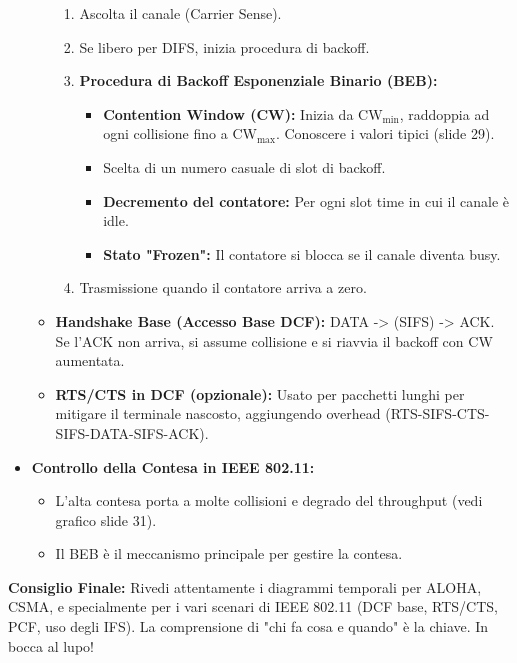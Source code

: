 \begin{itemize}
\begin{itemize}
        \begin{enumerate}
            \item Ascolta il canale (Carrier Sense).
            \item Se libero per DIFS, inizia procedura di backoff.
            \item \textbf{Procedura di Backoff Esponenziale Binario (BEB):}
            \begin{itemize}
                \item \textbf{Contention Window (CW):} Inizia da $\text{CW}_{\min}$, raddoppia ad ogni collisione fino a $\text{CW}_{\max}$. Conoscere i valori tipici (slide 29).
                \item Scelta di un numero casuale di slot di backoff.
                \item \textbf{Decremento del contatore:} Per ogni slot time in cui il canale è idle.
                \item \textbf{Stato "Frozen":} Il contatore si blocca se il canale diventa busy.
            \end{itemize}
            \item Trasmissione quando il contatore arriva a zero.
        \end{enumerate}
        \item \textbf{Handshake Base (Accesso Base DCF):} DATA -> (SIFS) -> ACK. Se l'ACK non arriva, si assume collisione e si riavvia il backoff con CW aumentata.
        \item \textbf{RTS/CTS in DCF (opzionale):} Usato per pacchetti lunghi per mitigare il terminale nascosto, aggiungendo overhead (RTS-SIFS-CTS-SIFS-DATA-SIFS-ACK).
    \end{itemize}
    \item \textbf{Controllo della Contesa in IEEE 802.11:}
    \begin{itemize}
        \item L'alta contesa porta a molte collisioni e degrado del throughput (vedi grafico slide 31).
        \item Il BEB è il meccanismo principale per gestire la contesa.
    \end{itemize}
\end{itemize}

\textbf{Consiglio Finale:} Rivedi attentamente i diagrammi temporali per ALOHA, CSMA, e specialmente per i vari scenari di IEEE 802.11 (DCF base, RTS/CTS, PCF, uso degli IFS). La comprensione di "chi fa cosa e quando" è la chiave. In bocca al lupo!

